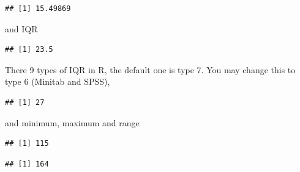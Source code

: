 \documentclass[]{book}
\newenvironment{Shaded}{\begin{snugshade}}{\end{snugshade}}
\newcommand{\KeywordTok}[1]{\textcolor[rgb]{0.13,0.29,0.53}{\textbf{#1}}}
\newcommand{\DataTypeTok}[1]{\textcolor[rgb]{0.13,0.29,0.53}{#1}}
\newcommand{\DecValTok}[1]{\textcolor[rgb]{0.00,0.00,0.81}{#1}}
\newcommand{\OperatorTok}[1]{\textcolor[rgb]{0.81,0.36,0.00}{\textbf{#1}}}
\newcommand{\NormalTok}[1]{#1}
\theoremstyle{definition}
\theoremstyle{definition}
\theoremstyle{remark}
\begin{document}
\begin{verbatim}
## [1] 15.49869
\end{verbatim}

and IQR

\begin{Shaded}
\end{Shaded}

\begin{verbatim}
## [1] 23.5
\end{verbatim}

There 9 types of IQR in R, the default one is type 7. You may change
this to type 6 (Minitab and SPSS),

\begin{Shaded}
\end{Shaded}

\begin{verbatim}
## [1] 27
\end{verbatim}

and minimum, maximum and range

\begin{Shaded}
\end{Shaded}

\begin{verbatim}
## [1] 115
\end{verbatim}

\begin{Shaded}
\end{Shaded}

\begin{verbatim}
## [1] 164
\end{verbatim}

\begin{Shaded}
\end{Shaded}
\end{document}
